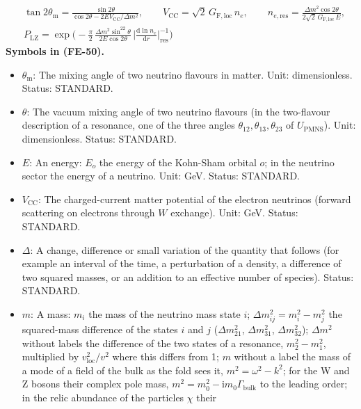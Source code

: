 \documentclass[
  10pt,
]{article}
\providecommand{\tightlist}{%
  \setlength{\itemsep}{0pt}\setlength{\parskip}{0pt}}
\begin{document}
\[
\begin{aligned}
&\tan2\theta_{\mathrm{m}} = \frac{\sin2\theta}{\cos2\theta - 2EV_{\mathrm{CC}}/\Delta m^2},\qquad
 V_{\mathrm{CC}} = \sqrt2\,G_{\mathrm{F,loc}}\,n_e,\qquad
 n_{e,\mathrm{res}} = \frac{\Delta m^2\cos2\theta}{2\sqrt2\,G_{\mathrm{F,loc}}\,E},\\
&P_{\mathrm{LZ}} = \exp\Big(-\frac{\pi}{2}\,\frac{\Delta m^2\sin^22\theta}{2E\cos2\theta}\,\Big\lvert\frac{\mathrm{d}\ln n_e}{\mathrm{d}r}\Big\rvert^{-1}_{\mathrm{res}}\Big)
\end{aligned} \tag{FE-50}
\] \textbf{Symbols in (FE-50).}

\begin{itemize}
\tightlist
\item
  \(\theta_{\mathrm{m}}\): The mixing angle of two neutrino flavours in
  matter. Unit: dimensionless. Status: STANDARD.
\item
  \(\theta\): The vacuum mixing angle of two neutrino flavours (in the
  two-flavour description of a resonance, one of the three angles
  \(\theta_{12}, \theta_{13}, \theta_{23}\) of \(U_{\mathrm{PMNS}}\)).
  Unit: dimensionless. Status: STANDARD.
\item
  \(E\): An energy: \(E_o\) the energy of the Kohn-Sham orbital \(o\);
  in the neutrino sector the energy of a neutrino. Unit: GeV. Status:
  STANDARD.
\item
  \(V_{\mathrm{CC}}\): The charged-current matter potential of the
  electron neutrinos (forward scattering on electrons through \(W\)
  exchange). Unit: GeV. Status: STANDARD.
\item
  \(\Delta\): A change, difference or small variation of the quantity
  that follows (for example an interval of the time, a perturbation of a
  density, a difference of two squared masses, or an addition to an
  effective number of species). Status: STANDARD.
\item
  \(m\): A mass: \(m_i\) the mass of the neutrino mass state \(i\);
  \(\Delta m_{ij}^2 = m_i^2 - m_j^2\) the squared-mass difference of the
  states \(i\) and \(j\) (\(\Delta m_{21}^2\), \(\Delta m_{31}^2\),
  \(\Delta m_{32}^2\)); \(\Delta m^2\) without labels the difference of
  the two states of a resonance, \(m_2^2 - m_1^2\), multiplied by
  \(v_{\mathrm{loc}}^2/v^2\) where this differs from 1; \(m\) without a
  label the mass of a mode of a field of the bulk as the fold sees it,
  \(m^2 = \omega^2 - k^2\); for the W and Z bosons their complex pole
  mass, \(m^2 = m_0^2 - \mathrm{i}m_0\Gamma_{\mathrm{bulk}}\) to the
  leading order; in the relic abundance of the particles \(\chi\) their

\end{itemize}
\end{document}
